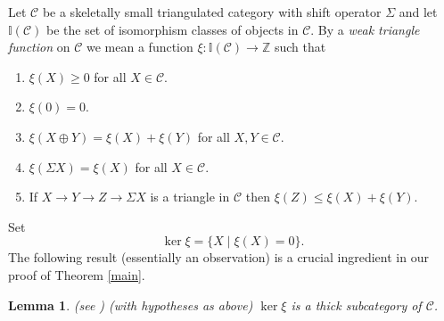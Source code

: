 \documentclass{amsart}
\newcommand{\I}{\mathbb{I} }
\newcommand{\C}{\mathcal{C} }
\newcommand{\Z}{\mathbb{Z} }
\newcommand{\rt}{\rightarrow}
\theoremstyle{plain}
\newtheorem{lemma}[theorem]{Lemma}
\theoremstyle{definition}
\theoremstyle{remark}
\begin{document}
\s \label{t-f} Let $\C$ be a skeletally  small triangulated category  with shift operator $\Sigma$ and let $\I(\C)$ be the set of isomorphism classes of objects in $\C$. By a \emph{weak triangle function} on $\C$ we mean a function $\xi \colon \I(\C) \rt \Z$ such that
\begin{enumerate}
  \item $\xi(X) \geq 0$ for all $X \in \C$.
  \item $\xi(0) = 0$.
  \item $\xi(X \oplus Y) = \xi(X) + \xi(Y)$ for all $X, Y \in \C$.
  \item $\xi(\Sigma X ) = \xi(X)$ for all $X \in \C$.
  \item If $X \rt Y \rt Z \rt \Sigma X $ is a triangle in $\C$ then
   $\xi(Z) \leq \xi(X) + \xi(Y)$.
\end{enumerate}
\s Set $$\ker \xi = \{ X \mid \xi(X) = 0 \}.$$
The following result (essentially an observation) is a crucial ingredient in our proof of Theorem \ref{main}.
\begin{lemma}(see \cite[2,3]{P4} )
\label{ker-lemma}(with hypotheses as above)
$\ker \xi $ is a thick subcategory of $\C$.
\end{lemma}
\end{document}
